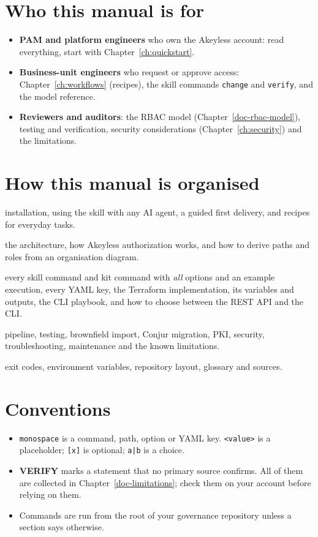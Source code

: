 \section{Who this manual is for}
\begin{itemize}
\item \textbf{PAM and platform engineers} who own the Akeyless account: read everything, start
  with Chapter~\ref{ch:quickstart}.
\item \textbf{Business-unit engineers} who request or approve access: Chapter~\ref{ch:workflows}
  (recipes), the skill commands \texttt{change} and \texttt{verify}, and the model reference.
\item \textbf{Reviewers and auditors}: the RBAC model (Chapter~\ref{doc-rbac-model}), testing and
  verification, security considerations (Chapter~\ref{ch:security}) and the limitations.
\end{itemize}

\section{How this manual is organised}
\begin{description}[style=nextline,leftmargin=1.5em]
\item[Part~\ref{part:start}, Getting started] installation, using the skill with any AI agent, a guided first delivery, and recipes for everyday tasks.
\item[Part~\ref{part:concepts}, Concepts and design] the architecture, how Akeyless authorization
  works, and how to derive paths and roles from an organisation diagram.
\item[Part~\ref{part:reference}, Reference] every skill command and kit command with \emph{all}
  options and an example execution, every YAML key, the Terraform implementation, its variables and
  outputs, the CLI playbook, and how to choose between the REST API and the CLI.
\item[Part~\ref{part:operations}, Operations] pipeline, testing, brownfield import, Conjur
  migration, PKI, security, troubleshooting, maintenance and the known limitations.
\item[Appendices] exit codes, environment variables, repository layout, glossary and sources.
\end{description}

\section{Conventions}\label{sec:conventions}
\begin{itemize}
\item \texttt{monospace} is a command, path, option or YAML key. \texttt{<value>} is a placeholder;
  \texttt{[x]} is optional; \texttt{a|b} is a choice.
\item \textbf{VERIFY} marks a statement that no primary source confirms. All of them are collected
  in Chapter~\ref{doc-limitations}; check them on your account before relying on them.
\item Commands are run from the root of your governance repository unless a section says otherwise.
\end{itemize}

